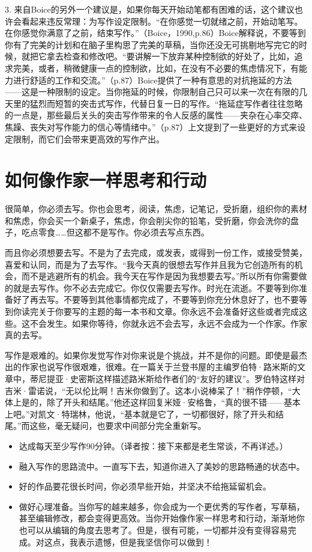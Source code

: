 \documentclass[12pt]{ctexart}
\begin{document}
3. 来自Boice的另外一个建议是，如果你每天开始动笔都有困难的话，这个建议也许会看起来违反常理：为写作设定限制。“在你感觉一切就绪之前，开始动笔写。在你感觉你满意了之前，结束写作。”（Boice，1990,p.86）Boice解释说，不要等到你有了完美的计划和在脑子里构思了完美的草稿，当你还没无可挑剔地写完它的时候，就把它拿去检查和修改吧。“要讲解一下放弃某种控制欲的好处了，比如，追求完美，或者，稍微健康一点的控制欲，比如，在没有不必要的焦虑情况下，有能力进行舒适的工作和交流。”（p.87）Boice提供了一种有意思的对抗拖延的方法——这是一种限制的设定。当你拖延的时候，你限制自己只可以来一次在有限的几天里的猛烈而短暂的突击式写作，代替日复一日的写作。“拖延症写作者往往忽略的一点是，那些最后关头的突击写作带来的令人反感的属性——夹杂在心率交瘁、焦躁、丧失对写作能力的信心等情绪中。”（p.87）上文提到了一些更好的方式来设定限制，而它们会带来更高效的写作产出。

\section{如何像作家一样思考和行动}
很简单，你必须去写。你也会思考，阅读，焦虑，记笔记，受折磨，组织你的素材和焦虑，你会买一个新桌子，焦虑，你会削尖你的铅笔，受折磨，你会洗你的盘子，吃点零食……但这都不是写作。你必须去写点东西。

而且你必须想要去写。不是为了去完成，或发表，或得到一份工作，或接受赞美，喜爱和认同，而是为了去写作。“我今天真的很想去写作并且我为它创造所有的机会，而不是逃避所有的机会。我今天在写作是因为我想要去写。”所以所有你需要做的就是去写作。你不必去完成它。你仅仅需要去写作。时光在流逝。不要等到你准备好了再去写。不要等到其他事情都完成了，不要等到你充分休息好了，也不要等到你读完关于你要写的主题的每一本书和文章。你永远不会准备好这些或者完成这些。这不会发生。如果你等待，你就永远不会去写，永远不会成为一个作家。作家真的去写。

写作是艰难的。如果你发觉写作对你来说是个挑战，并不是你的问题。即使是最杰出的作家也说写作很艰难，很难。在一篇关于兰登书屋的主编罗伯特·路米斯的文章中，蒂尼提亚·史密斯这样描述路米斯给作者们的“友好的建议”。罗伯特这样对吉米·雷诺说，“无以伦比啊！吉米你做到了。这本小说棒呆了！”稍作停顿，“大体上是的，除了开头和结尾。”他还这样回复米娅·安格鲁，“真的很不错——基本上吧。”对凯文·特瑞林，他说，“基本就是它了，一切都很好，除了开头和结尾。”而这些，毫无疑问，也要求中间部分完全重新写。

\begin{itemize}
\item 达成每天至少写作90分钟。（译者按：接下来都是老生常谈，不再详述。）
\item 融入写作的思路流中。一直写下去，知道你进入了美妙的思路畅通的状态中。
\item 好的作品要花很长时间，你必须早些开始，并坚决不给拖延留机会。
\item 做好心理准备。当你写的越来越多，你会成为一个更优秀的写作者，写草稿，甚至编辑修改，都会变得更高效。当你开始像作家一样思考和行动，渐渐地你也可以从编辑的角度去思考了。但是，很有可能，一切都并没有变得容易完成。对这点，我表示遗憾，但是我坚信你可以做到！
\end{itemize}
\end{document}
